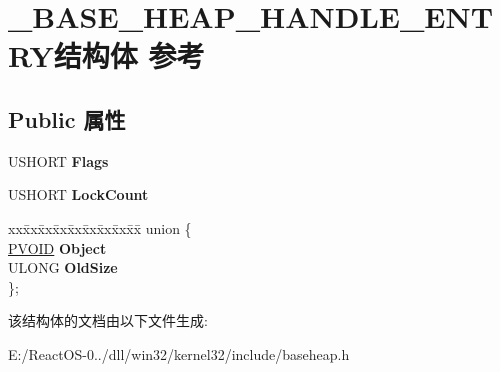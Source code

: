 \hypertarget{struct___b_a_s_e___h_e_a_p___h_a_n_d_l_e___e_n_t_r_y}{}\section{\+\_\+\+B\+A\+S\+E\+\_\+\+H\+E\+A\+P\+\_\+\+H\+A\+N\+D\+L\+E\+\_\+\+E\+N\+T\+R\+Y结构体 参考}
\label{struct___b_a_s_e___h_e_a_p___h_a_n_d_l_e___e_n_t_r_y}
\subsection*{Public 属性}
\begin{DoxyCompactItemize}
\item 
\mbox{\label{struct___b_a_s_e___h_e_a_p___h_a_n_d_l_e___e_n_t_r_y_addd9f7d84cd0f887eee2ca7212a5e3fb}} 
U\+S\+H\+O\+RT {\bfseries Flags}
\item 
\mbox{\label{struct___b_a_s_e___h_e_a_p___h_a_n_d_l_e___e_n_t_r_y_a8e01b943d33dfc8077875c925345db52}} 
U\+S\+H\+O\+RT {\bfseries Lock\+Count}
\item 
\mbox{\label{struct___b_a_s_e___h_e_a_p___h_a_n_d_l_e___e_n_t_r_y_a062636249a99caf39c44614b4df87f0e}} 
\begin{tabbing}
xx\=xx\=xx\=xx\=xx\=xx\=xx\=xx\=xx\=\kill
union \{\\
\>\hyperlink{interfacevoid}{PVOID} {\bfseries Object}\\
\>ULONG {\bfseries OldSize}\\
\}; \\

\end{tabbing}\end{DoxyCompactItemize}


该结构体的文档由以下文件生成\+:\begin{DoxyCompactItemize}
\item 
E\+:/\+React\+O\+S-\/0../dll/win32/kernel32/include/baseheap.\+h\end{DoxyCompactItemize}
